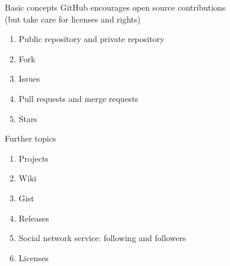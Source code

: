 \documentclass[english, nochinese]{pkuslide}
\begin{document}
\begin{frame}
\sectionpage
\end{frame}

\begin{frame}{Basic concepts}
GitHub encourages open source contributions \\
(but take care for licenses and rights)
\begin{enumerate}
\item Public repository and private repository
\item Fork
\item Issues
\item Pull requests and merge requests
\item Stars
\end{enumerate}
\end{frame}

\begin{frame}{Further topics}
\begin{enumerate}
\item Projects
\item Wiki
\item Gist
\item Releases
\item Social network service: following and followers
\item Licenses
\end{enumerate}
\end{frame}

	
\end{document}
